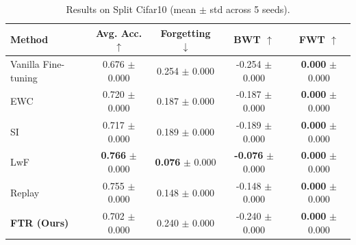 \begin{table}[t]
\centering
\caption{Results on Split Cifar10 (mean $\pm$ std across 5 seeds).}
\label{tab:split_cifar10}
\begin{tabular}{lcccc}
\toprule
Method & Avg. Acc. $\uparrow$ & Forgetting $\downarrow$ & BWT $\uparrow$ & FWT $\uparrow$ \\
\midrule
Vanilla Fine-tuning & 0.676 $\pm$ 0.000 & 0.254 $\pm$ 0.000 & -0.254 $\pm$ 0.000 & \textbf{0.000} $\pm$ 0.000 \\
EWC & 0.720 $\pm$ 0.000 & 0.187 $\pm$ 0.000 & -0.187 $\pm$ 0.000 & \textbf{0.000} $\pm$ 0.000 \\
SI & 0.717 $\pm$ 0.000 & 0.189 $\pm$ 0.000 & -0.189 $\pm$ 0.000 & \textbf{0.000} $\pm$ 0.000 \\
LwF & \textbf{0.766} $\pm$ 0.000 & \textbf{0.076} $\pm$ 0.000 & \textbf{-0.076} $\pm$ 0.000 & \textbf{0.000} $\pm$ 0.000 \\
Replay & 0.755 $\pm$ 0.000 & 0.148 $\pm$ 0.000 & -0.148 $\pm$ 0.000 & \textbf{0.000} $\pm$ 0.000 \\
\textbf{FTR (Ours)} & 0.702 $\pm$ 0.000 & 0.240 $\pm$ 0.000 & -0.240 $\pm$ 0.000 & \textbf{0.000} $\pm$ 0.000 \\
\bottomrule
\end{tabular}
\end{table}